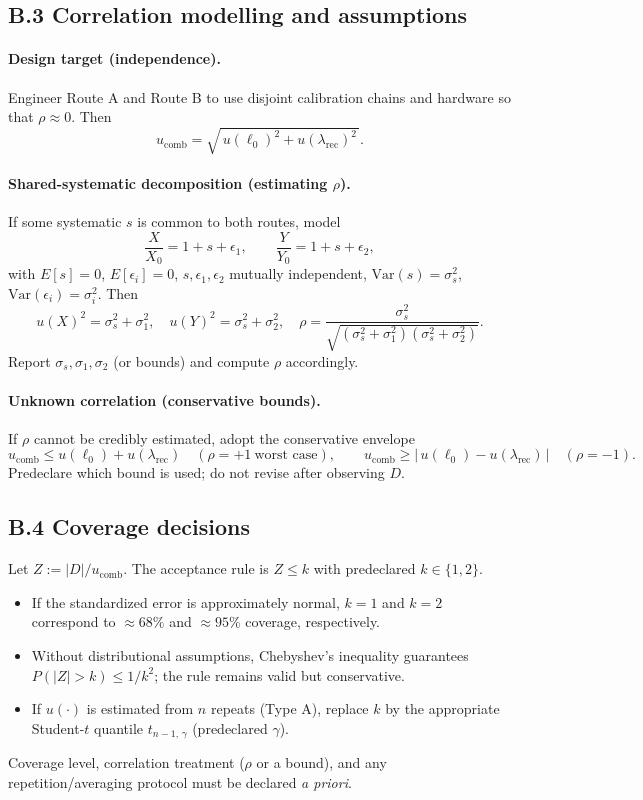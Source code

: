 \documentclass[11pt]{article}
\theoremstyle{plain}
\theoremstyle{definition}
\theoremstyle{remark}
\begin{document}
\subsection*{B.3 Correlation modelling and assumptions}
\paragraph{Design target (independence).}
Engineer Route A and Route B to use disjoint calibration chains and hardware so that \(\rho\approx 0\). Then
\[
u_{\mathrm{comb}}=\sqrt{\,u(\ell_0)^2 + u(\lambda_{\mathrm{rec}})^2\,}.
\]

\paragraph{Shared-systematic decomposition (estimating \(\rho\)).}
If some systematic \(s\) is common to both routes, model
\[
\frac{X}{X_0}=1+s+\epsilon_1,\qquad
\frac{Y}{Y_0}=1+s+\epsilon_2,
\]
with \(E[s]=0\), \(E[\epsilon_i]=0\), \(s,\epsilon_1,\epsilon_2\) mutually independent, \(\mathrm{Var}(s)=\sigma_s^2\), \(\mathrm{Var}(\epsilon_i)=\sigma_i^2\).
Then
\[
u(X)^2=\sigma_s^2+\sigma_1^2,\quad
u(Y)^2=\sigma_s^2+\sigma_2^2,\quad
\rho=\frac{\sigma_s^2}{\sqrt{(\sigma_s^2+\sigma_1^2)(\sigma_s^2+\sigma_2^2)}}.
\]
Report \(\sigma_s,\sigma_1,\sigma_2\) (or bounds) and compute \(\rho\) accordingly.

\paragraph{Unknown correlation (conservative bounds).}
If \(\rho\) cannot be credibly estimated, adopt the conservative envelope
\[
u_{\mathrm{comb}} \le u(\ell_0)+u(\lambda_{\mathrm{rec}})\quad(\rho=+1\ \text{worst case}),\qquad
u_{\mathrm{comb}} \ge \big|\,u(\ell_0)-u(\lambda_{\mathrm{rec}})\,\big|\quad(\rho=-1).
\]
Predeclare which bound is used; do not revise after observing \(D\).

\subsection*{B.4 Coverage decisions}
Let \(Z:=|D|/u_{\mathrm{comb}}\). The acceptance rule is \(Z\le k\) with predeclared \(k\in\{1,2\}\).
\begin{itemize}
  \item If the standardized error is approximately normal, \(k=1\) and \(k=2\) correspond to \(\approx68\%\) and \(\approx95\%\) coverage, respectively.
  \item Without distributional assumptions, Chebyshev’s inequality guarantees \(P(|Z|>k)\le 1/k^2\); the rule remains valid but conservative.
  \item If \(u(\cdot)\) is estimated from \(n\) repeats (Type A), replace \(k\) by the appropriate Student-\(t\) quantile \(t_{n-1,\,\gamma}\) (predeclared \(\gamma\)).
\end{itemize}
Coverage level, correlation treatment (\(\rho\) or a bound), and any repetition/averaging protocol must be declared \emph{a priori}.
\end{document}
